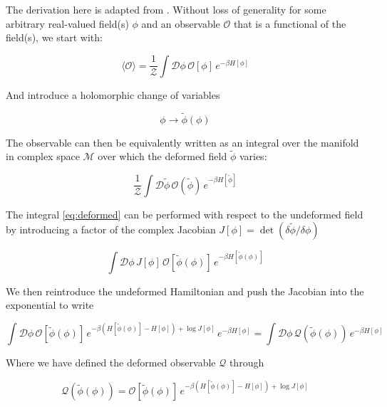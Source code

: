 \documentclass[12pt]{article}
\begin{document}
The derivation here is adapted from \cite{Detmold_2021}. Without loss of generality
for some arbitrary real-valued field(s) $\phi$ and an observable $\mathcal{O}$ that is a functional of the field(s), we start with:

\begin{equation} \label{eq:undeformed}
	\langle \mathcal{O} \rangle = \frac{1}{\mathcal{Z}} \int \mathcal{D}\phi \, \mathcal{O}[\phi] \, e^{-\beta H[\phi]}
\end{equation}

And introduce a holomorphic change of variables 

\begin{equation*}
	\phi \rightarrow \tilde{\phi}(\phi)
\end{equation*}

The observable can then be equivalently written as an integral over the manifold in complex space $\mathcal{M}$ 
over which the deformed field $\tilde{\phi}$ varies:

\begin{equation} \label{eq:deformed}
	\frac{1}{\mathcal{Z}} \int \mathcal{D}\tilde{\phi} \, \mathcal{O}(\tilde{\phi}) \, e^{-\beta H[\tilde{\phi}]}
\end{equation}

The integral \ref{eq:deformed} can be performed with respect to the undeformed field by introducing a factor of the complex 
Jacobian $J[\phi] = \det \left( \delta \tilde{\phi} / \delta \phi \right)$

\begin{equation*}
	\int \mathcal{D}\phi \, J[\phi] \, \mathcal{O}[\tilde{\phi}(\phi)] \, e^{-\beta H[\tilde{\phi}(\phi)]}
\end{equation*}

We then reintroduce the undeformed Hamiltonian and push the Jacobian into the exponential to write

\begin{equation} \label{eq:rewrite}
	\int \mathcal{D}\phi \, \mathcal{O}[\tilde{\phi}(\phi)] \, e^{-\beta \left( H[\tilde{\phi}(\phi)] - H[\phi] \right) + \log J[\phi]}\, e^{-\beta H[\phi]} 
	= \int \mathcal{D}\phi \, \mathcal{Q}(\tilde{\phi}(\phi)) \, e^{-\beta H[\phi]} 
\end{equation}

Where we have defined the deformed observable $\mathcal{Q}$ through

\begin{equation}
	 \mathcal{Q}(\tilde{\phi}(\phi)) = \mathcal{O}[\tilde{\phi}(\phi)] \, e^{-\beta \left( H[\tilde{\phi}(\phi)] - H[\phi] \right) + \log J[\phi]}
\end{equation}
\end{document}
